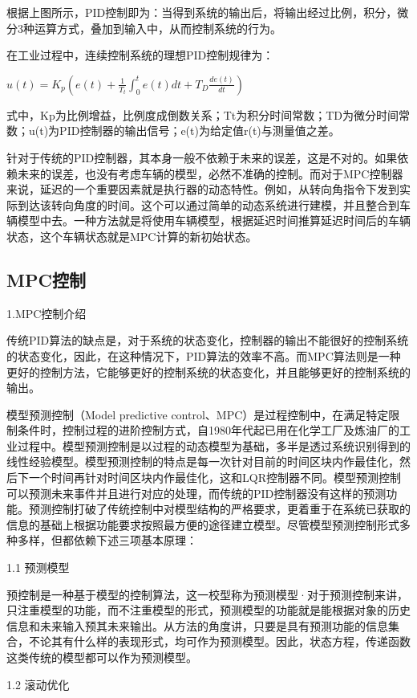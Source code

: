 根据上图所示，PID控制即为：当得到系统的输出后，将输出经过比例，积分，微分3种运算方式，叠加到输入中，从而控制系统的行为。

在工业过程中，连续控制系统的理想PID控制规律为：

$u(t)=K_{p}\left(e(t)+\frac{1}{T_{t}} \int_{0}^{t} e(t) d t+T_{D} \frac{d e(t)}{d t}\right)$

式中，Kp为比例增益，比例度成倒数关系；Tt为积分时间常数；TD为微分时间常数；u(t)为PID控制器的输出信号；e(t)为给定值r(t)与测量值之差。

针对于传统的PID控制器，其本身一般不依赖于未来的误差，这是不对的。如果依赖未来的误差，也没有考虑车辆的模型，必然不准确的控制。而对于MPC控制器来说，延迟的一个重要因素就是执行器的动态特性。例如，从转向角指令下发到实际到达该转向角度的时间。这个可以通过简单的动态系统进行建模，并且整合到车辆模型中去。一种方法就是将使用车辆模型，根据延迟时间推算延迟时间后的车辆状态，这个车辆状态就是MPC计算的新初始状态。

\subsection{MPC控制}

1.MPC控制介绍

传统PID算法的缺点是，对于系统的状态变化，控制器的输出不能很好的控制系统的状态变化，因此，在这种情况下，PID算法的效率不高。而MPC算法则是一种更好的控制方法，它能够更好的控制系统的状态变化，并且能够更好的控制系统的输出。

模型预测控制（Model predictive control、MPC）是过程控制中，在满足特定限制条件时，控制过程的进阶控制方式，自1980年代起已用在化学工厂及炼油厂的工业过程中。模型预测控制是以过程的动态模型为基础，多半是透过系统识别得到的线性经验模型。模型预测控制的特点是每一次针对目前的时间区块内作最佳化，然后下一个时间再针对时间区块内作最佳化，这和LQR控制器不同。模型预测控制可以预测未来事件并且进行对应的处理，而传统的PID控制器没有这样的预测功能。预测控制打破了传统控制中对模型结构的严格要求，更着重于在系统已获取的信息的基础上根据功能要求按照最方便的途径建立模型。尽管模型预测控制形式多种多样，但都依赖下述三项基本原理：

1.1 预测模型

预控制是一种基于模型的控制算法，这一校型称为预测模型·对于预测控制来讲，只注重模型的功能，而不注重模型的形式，预测模型的功能就是能根据对象的历史信息和未来输入预其未来输出。从方法的角度讲，只要是具有预测功能的信息集合，不论其有什么样的表现形式，均可作为预测模型。因此，状态方程，传递函数这类传统的模型都可以作为预测模型。

1.2 滚动优化

